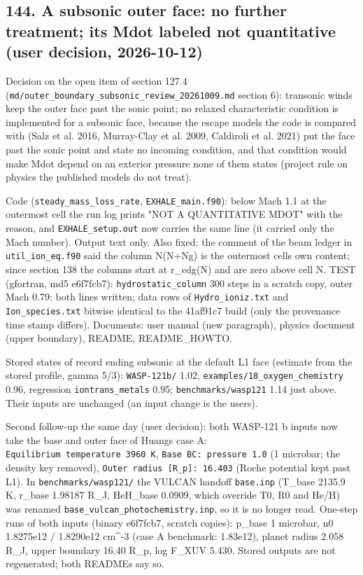 \documentclass[english,a4paper]{my_memo}
\begin{document}
\subsection{144. A subsonic outer face: no further treatment; its Mdot labeled not quantitative (user decision, 2026-10-12)}\label{144-a-subsonic-outer-face-no-further-treatment-its-mdot-labeled-not-quantitative-user-decision-2026-10-12}

Decision on the open item of section 127.4 (\texttt{md/outer\_boundary\_subsonic\_review\_20261009.md} section 6): transonic winds keep the outer face past the sonic point; no relaxed characteristic condition is implemented for a subsonic face, because the escape models the code is compared with (Salz et al. 2016, Murray-Clay et al. 2009, Caldiroli et al. 2021) put the face past the sonic point and state no incoming condition, and that condition would make Mdot depend on an exterior pressure none of them states (project rule on physics the published models do not treat).

Code (\texttt{steady\_mass\_loss\_rate}, \texttt{EXHALE\_main.f90}): below Mach 1.1 at the outermost cell the run log prints "NOT A QUANTITATIVE MDOT" with the reason, and \texttt{EXHALE\_setup.out} now carries the same line (it carried only the Mach number). Output text only. Also fixed: the comment of the beam ledger in \texttt{util\_ion\_eq.f90} said the column N(N+Ng) is the outermost cell\textquotesingle s own content; since section 138 the columns start at r\_edg(N) and are zero above cell N. TEST (gfortran, md5 e6f7fcb7): \texttt{hydrostatic\_column} 300 steps in a scratch copy, outer Mach 0.79: both lines written; data rows of \texttt{Hydro\_ioniz.txt} and \texttt{Ion\_species.txt} bitwise identical to the 41af91c7 build (only the provenance time stamp differs). Documents: user manual (new paragraph), physics document (upper boundary), README, README\_HOWTO.

Stored states of record ending subsonic at the default L1 face (estimate from the stored profile, gamma 5/3): \texttt{WASP-121b/} 1.02, \texttt{examples/18\_oxygen\_chemistry} 0.96, regression \texttt{iontrans\_metals} 0.95; \texttt{benchmarks/wasp121} 1.14 just above. Their inputs are unchanged (an input change is the user\textquotesingle s).

Second follow-up the same day (user decision): both WASP-121 b inputs now take the base and outer face of Huang\textquotesingle s case A: \texttt{Equilibrium\ temperature\ 3960\ K}, \texttt{Base\ BC:\ pressure\ 1.0} (1 microbar; the density key removed), \texttt{Outer\ radius\ {[}R\_p{]}:\ 16.403} (Roche potential kept past L1). In \texttt{benchmarks/wasp121/} the VULCAN handoff \texttt{base.inp} (T\_base 2135.9 K, r\_base 1.98187 R\_J, HeH\_base 0.0909, which override T0, R0 and He/H) was renamed \texttt{base\_vulcan\_photochemistry.inp}, so it is no longer read. One-step runs of both inputs (binary e6f7fcb7, scratch copies): p\_base 1 microbar, n0 1.8275e12 / 1.8290e12 cm\^{}-3 (case A benchmark: 1.83e12), planet radius 2.058 R\_J, upper boundary 16.40 R\_p, log F\_XUV 5.430. Stored outputs are not regenerated; both READMEs say so.
\end{document}
